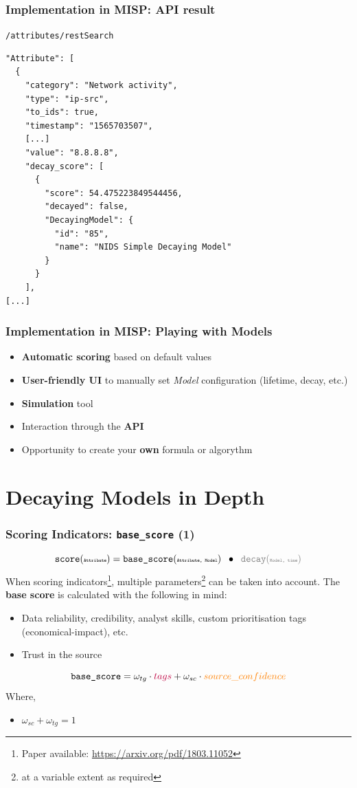 \begin{frame}[fragile]
    \frametitle{Implementation in MISP: API result}
    \texttt{/attributes/restSearch}
    \begin{lstlisting}
"Attribute": [
  {
    "category": "Network activity",
    "type": "ip-src",
    "to_ids": true,
    "timestamp": "1565703507",
    [...]
    "value": "8.8.8.8",
    "decay_score": [
      {
        "score": 54.475223849544456,
        "decayed": false,
        "DecayingModel": {
          "id": "85",
          "name": "NIDS Simple Decaying Model"
        }
      }
    ],
[...]
    \end{lstlisting}
\end{frame}

\begin{frame}
\frametitle{Implementation in MISP: Playing with Models}
    \begin{itemize}
        \item \textbf{Automatic scoring} based on default values
        \item \textbf{User-friendly UI} to manually set \textit{Model} configuration (lifetime, decay, etc.)
        \item \textbf{Simulation} tool
        \item Interaction through the \textbf{API}
        \item Opportunity to create your \textbf{own} formula or algorythm
    \end{itemize}
\end{frame}

\section{Decaying Models in Depth}
\begin{frame}
    \frametitle{Scoring Indicators: \texttt{base\_score} (1)}
    $$ \texttt{score}(\texttt{\tiny Attribute}) = \texttt{base\_score}(\texttt{\tiny Attribute, Model}) \;\;\bullet\;\; {\color{gray}\texttt{decay}(\texttt{\tiny Model, time})} $$
        When scoring indicators\footnote{Paper available: \url{https://arxiv.org/pdf/1803.11052}}, multiple parameters\footnote{at a variable extent as required} can be taken into account. The {\bf base score} is calculated with the following in mind:
    \begin{itemize}
        \item {\color{purple}Data reliability, credibility, analyst skills, custom prioritisation tags (economical-impact), etc.}
        \item {\color{orange}Trust in the source}
    \end{itemize}
    \vspace{0.3cm}
    $$\texttt{base\_score} = \omega_{tg} \cdot {\color{purple}tags} + \omega_{sc} \cdot {\color{orange}source\_confidence}$$
    Where,
    \begin{itemize}
        \item[] $\omega_{sc} + \omega_{tg} = 1$
    \end{itemize}
\end{frame}

